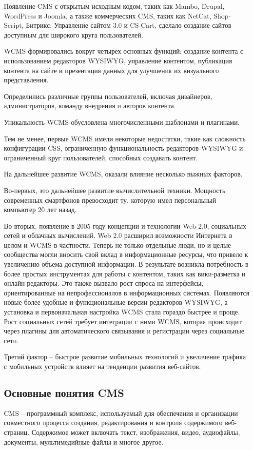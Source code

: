 Появление CMS с открытым исходным кодом, таких как Mambo, Drupal, WordPress и Joomla, а также коммерческих CMS, таких как NetCat, Shop-Script, Битрикс: Управление сайтом 3.0 и CS-Cart, сделало создание сайтов доступным для широкого круга пользователей.

WCMS формировались вокруг четырех основных функций: создание контента с использованием редакторов WYSIWYG, управление контентом, публикация контента на сайте и презентация данных для улучшения их визуального представления.

Определились различные группы пользователей, включая дизайнеров, администраторов, команду внедрения и авторов контента. 

Уникальность WCMS обусловлена многочисленными шаблонами и плагинами.

Тем не менее, первые WCMS имели некоторые недостатки, такие как сложность конфигурации CSS, ограниченную функциональность редакторов WYSIWYG и ограниченный круг пользователей, способных создавать контент.

На дальнейшее развитие WCMS, оказали влияние несколько выжных факторов.

Во-первых, это дальнейшее развитие вычислительной техники. Мощность современных смартфонов превосходит ту, которую имел персональный компьютер 20 лет назад.

Во-вторых, появление в 2005 году концепции и технологии Web 2.0, социальных сетей и облачных вычислений. Web 2.0 расширил возможности Интернета в целом и WCMS в частности. Теперь не только отдельные люди, но и целые сообщества могли вносить свой вклад в информационные ресурсы, что привело к увеличению объема доступной информации. В результате возникла потребность в более простых инструментах для работы с контентом, таких как вики-разметка и онлайн-редакторы. Это также вызвало рост спроса на интерфейсы, ориентированные на непрофессионалов в информационных системах. Появляются новые более удобные и функциональные версии редакторов WYSIWYG, а установка и первоначальная настройка WCMS стала гораздо быстрее и проще. Рост социальных сетей требует интеграции с ними WCMS, которая происходит через плагины для автоматического связывания и регистрации через социальные сети.

Третий фактор -- быстрое развитие мобильных технологий и увеличение трафика с мобильных устройств влияет на тенденции развития веб-сайтов.

\subsection{Основные понятия CMS}
CMS -- программный комплекс, используемый для обеспечения и организации совместного процесса создания, редактирования и контроля содержимого веб-страниц. Содержимое может включать текст, изображения, видео, аудиофайлы, документы, мультимедийные файлы и многое другое.


